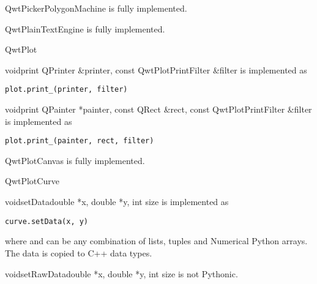 \documentclass{manual}
\begin{document}
{\begin{classdesc*}{QwtPickerPolygonMachine}
  is fully implemented.
\end{classdesc*}

\begin{classdesc*}{QwtPlainTextEngine}
  is fully implemented.
\end{classdesc*}

\begin{classdesc*}{QwtPlot}

  \begin{cfuncdesc}{void}{print}{
      QPrinter \&printer, const QwtPlotPrintFilter \&filter}
    is implemented as
    \begin{verbatim}
plot.print_(printer, filter)
    \end{verbatim}
  \end{cfuncdesc}

  \begin{cfuncdesc}{void}{print}{
      QPainter *painter,
      const QRect \&rect,
      const QwtPlotPrintFilter \&filter}
    is implemented as
    \begin{verbatim}
plot.print_(painter, rect, filter)
    \end{verbatim}
  \end{cfuncdesc}

\end{classdesc*}

\begin{classdesc*}{QwtPlotCanvas}
  is fully implemented.
\end{classdesc*}

\begin{classdesc*}{QwtPlotCurve}

  \begin{cfuncdesc}{void}{setData}{double *x, double *y, int size}
    is implemented as
    \begin{verbatim}
curve.setData(x, y)
    \end{verbatim}
    where  and  can be any combination of lists, tuples and
    Numerical Python arrays.  The data is copied to C++ data types.
  \end{cfuncdesc}

  \begin{cfuncdesc}{void}{setRawData}{double *x, double *y, int size}
      is not Pythonic.
  \end{cfuncdesc}

\end{classdesc*}

}
\end{document}

